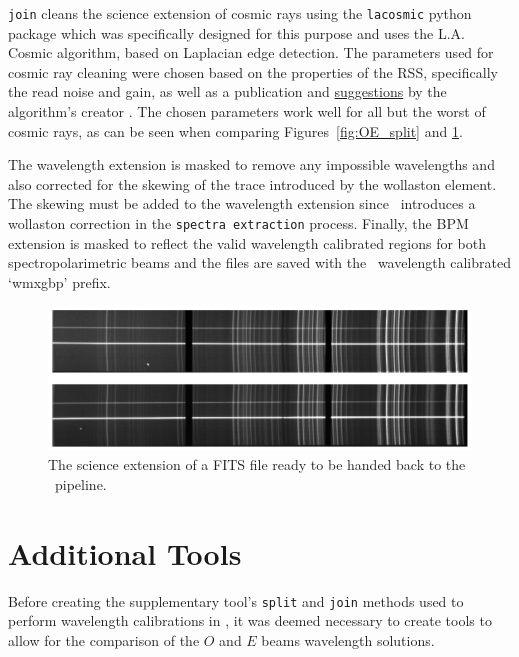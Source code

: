 \texttt{join} cleans the science extension of cosmic rays using the \texttt{lacosmic} python package which was specifically designed for this purpose and uses the L.A. Cosmic algorithm, based on Laplacian edge detection. The parameters used for cosmic ray cleaning were chosen based on the properties of the \gls{RSS}, specifically the read noise and gain, as well as a publication and \hyperlink{http://www.astro.yale.edu/dokkum/lacosmic/pars.html}{suggestions} by the algorithm's creator \citep{lacosmic}. The chosen parameters work well for all but the worst of cosmic rays, as can be seen when comparing Figures~\ref{fig:OE_split} and \ref{fig:polsalt_post_wav_cal}.
\prgph

The wavelength extension is masked to remove any impossible wavelengths and also corrected for the skewing of the trace introduced by the wollaston element. The skewing must be added to the wavelength extension since \polsalt\ introduces a wollaston correction in the \texttt{spectra extraction} process. Finally, the \gls{BPM} extension is masked to reflect the valid wavelength calibrated regions for both spectropolarimetric beams and the files are saved with the \polsalt\ wavelength calibrated `wmxgbp' prefix.

\begin{figure}[t]
    \centering
    \includegraphics[width = 1.0\textwidth]{figures/3_post_wav_cal.pdf}
    \caption{The science extension of a \gls{FITS} file ready to be handed back to the \polsalt\ pipeline.}
    \label{fig:polsalt_post_wav_cal}
\end{figure}


\section{Additional Tools}\label{sec:add_tools}

Before creating the supplementary tool's \texttt{split} and \texttt{join} methods used to perform wavelength calibrations in \iraf, it was deemed necessary to create tools to allow for the comparison of the $O$ and $E$ beams wavelength solutions.


